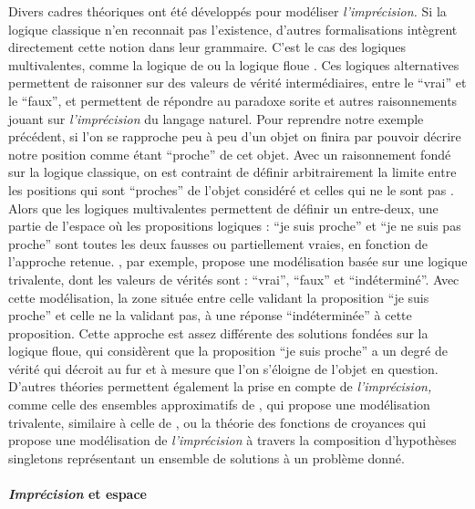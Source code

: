 Divers cadres théoriques ont été développés pour modéliser
\emph{l'imprécision.} Si la logique classique n'en reconnait pas
l'existence, d'autres formalisations intègrent directement cette
notion dans leur grammaire. C'est le cas des logiques multivalentes,
comme la logique de  ou la logique floue
\autocite{Williamson1994,Sorensen2018}. Ces logiques alternatives
permettent de raisonner sur des valeurs de vérité intermédiaires,
entre le \enquote{vrai} et le \enquote{faux}, et permettent de
répondre au paradoxe sorite et autres raisonnements jouant sur
\emph{l'imprécision} du langage naturel. Pour reprendre notre exemple
précédent, si l'on se rapproche peu à peu d'un objet on finira par
pouvoir décrire notre position comme étant \enquote{proche} de cet
objet. Avec un raisonnement fondé sur la logique classique, on est
contraint de définir arbitrairement la limite entre les positions qui
sont \enquote{proches} de l'objet considéré et celles qui ne le sont
pas \autocite{Fisher2000}. Alors que les logiques multivalentes
permettent de définir un entre-deux, une partie de l'espace où les
propositions logiques : \enquote{je suis proche} et \enquote{je ne
  suis pas proche} sont toutes les deux fausses ou partiellement
vraies, en fonction de l'approche retenue. \textcite{Tye1994}, par
exemple, propose une modélisation basée sur une logique trivalente,
dont les valeurs de vérités sont : \enquote{vrai}, \enquote{faux} et
\enquote{indéterminé}. Avec cette modélisation, la zone située entre
celle validant la proposition \enquote{je suis proche} et celle ne la
validant pas, à une réponse \enquote{indéterminée} à cette
proposition. Cette approche est assez différente des solutions fondées
sur la logique floue, qui considèrent que la proposition \enquote{je
  suis proche} a un degré de vérité qui décroit au fur et à mesure que
l'on s'éloigne de l'objet en question. D'autres théories permettent
également la prise en compte de \emph{l'imprécision,} comme celle des
ensembles approximatifs de \textcite{Pawlak1982}, qui propose une
modélisation trivalente, similaire à celle de \textcite{Tye1994}
\autocite{Pawlak1991}, ou la théorie des fonctions de croyances
\autocite{Shafer1976} qui propose une modélisation de
\emph{l'imprécision} à travers la composition d'hypothèses singletons
représentant un ensemble de solutions à un problème donné.

\paragraph{\emph{Imprécision} et espace}

